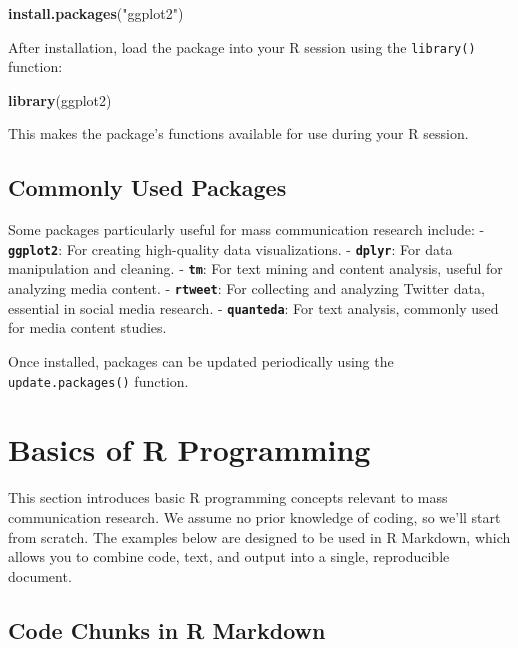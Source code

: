 \documentclass[
]{book}
\newenvironment{Shaded}{\begin{snugshade}}{\end{snugshade}}
\newcommand{\FunctionTok}[1]{\textcolor[rgb]{0.13,0.29,0.53}{\textbf{#1}}}
\newcommand{\NormalTok}[1]{#1}
\newcommand{\StringTok}[1]{\textcolor[rgb]{0.31,0.60,0.02}{#1}}
\begin{document}
\begin{Shaded}
\begin{Highlighting}[]
\FunctionTok{install.packages}\NormalTok{(}\StringTok{"ggplot2"}\NormalTok{)}
\end{Highlighting}
\end{Shaded}

After installation, load the package into your R session using the \texttt{library()} function:

\begin{Shaded}
\begin{Highlighting}[]
\FunctionTok{library}\NormalTok{(ggplot2)}
\end{Highlighting}
\end{Shaded}

This makes the package's functions available for use during your R session.

\subsection*{Commonly Used Packages}\label{commonly-used-packages}

Some packages particularly useful for mass communication research include:
- \textbf{\texttt{ggplot2}}: For creating high-quality data visualizations.
- \textbf{\texttt{dplyr}}: For data manipulation and cleaning.
- \textbf{\texttt{tm}}: For text mining and content analysis, useful for analyzing media content.
- \textbf{\texttt{rtweet}}: For collecting and analyzing Twitter data, essential in social media research.
- \textbf{\texttt{quanteda}}: For text analysis, commonly used for media content studies.

Once installed, packages can be updated periodically using the \texttt{update.packages()} function.

\section{Basics of R Programming}\label{basics-of-r-programming}

This section introduces basic R programming concepts relevant to mass communication research. We assume no prior knowledge of coding, so we'll start from scratch. The examples below are designed to be used in R Markdown, which allows you to combine code, text, and output into a single, reproducible document.

\subsection*{Code Chunks in R Markdown}\label{code-chunks-in-r-markdown}
\end{document}
